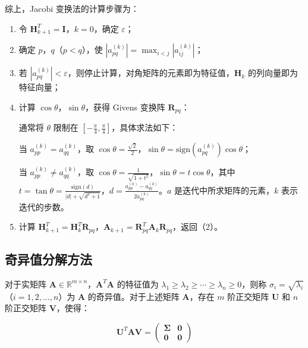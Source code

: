 综上，Jacobi 变换法的计算步骤为：

\begin{enumerate}
    \item 令 \(\mathbf{H}_{k+1}^T = \mathbf{I}\)，\(k = 0\)，确定 \(\varepsilon\)；
    \item 确定 \(p\)，\(q\)（\(p < q\)），使 \(|a_{pq}^{(k)}| = \max_{i < j} |a_{ij}^{(k)}|\)；
    \item 若 \(|a_{pq}^{(k)}| < \varepsilon\)，则停止计算，对角矩阵的元素即为特征值，\(\mathbf{H}_k\) 的列向量即为特征向量；
    \item 计算 \(\cos\theta\)，\(\sin\theta\)，获得 Givens 变换阵 \(\mathbf{R}_{pq}\)：
    
    通常将 \(\theta\) 限制在 \(\left[ -\frac{\pi}{4}, \frac{\pi}{4} \right]\)，具体求法如下：
    
    当 \(a_{pp}^{(k)} = a_{qq}^{(k)}\)，取 \(\cos\theta = \frac{\sqrt{2}}{2}\)，\(\sin\theta = \text{sign}(a_{pq}^{(k)}) \cos\theta\)；
    
    当 \(a_{pp}^{(k)} \neq a_{qq}^{(k)}\)，取 \(\cos\theta = \frac{1}{\sqrt{1 + t^2}}\)，\(\sin\theta = t \cos\theta\)，其中 \(t = \tan\theta = \frac{\text{sign}(d)}{|d| + \sqrt{d^2 + 1}}\)，\(d = \frac{a_{pp}^{(k)} - a_{qq}^{(k)}}{2 a_{pq}^{(k)}}\)。\(a\) 是迭代中所求矩阵的元素，\(k\) 表示迭代的步数。
    \item 计算 \(\mathbf{H}_{k+1}^T = \mathbf{H}_k^T \mathbf{R}_{pq}\)，\(\mathbf{A}_{k+1} = \mathbf{R}_{pq}^T \mathbf{A}_k \mathbf{R}_{pq}\)，返回（2）。
\end{enumerate}

\subsection{奇异值分解方法}

对于实矩阵 \(\mathbf{A} \in \mathbb{R}^{m \times n}\)，\(\mathbf{A}^T \mathbf{A}\) 的特征值为 \(\lambda_1 \geq \lambda_2 \geq \cdots \geq \lambda_n \geq 0\)，则称 \(\sigma_i = \sqrt{\lambda_i}\)（\(i = 1, 2, \ldots, n\)）为 \(\mathbf{A}\) 的奇异值。对于上述矩阵 \(\mathbf{A}\)，存在 \(m\) 阶正交矩阵 \(\mathbf{U}\) 和 \(n\) 阶正交矩阵 \(\mathbf{V}\)，使得：

\begin{equation}
\mathbf{U}^T \mathbf{A} \mathbf{V} = \begin{pmatrix} \mathbf{\Sigma} & \mathbf{0} \\ \mathbf{0} & \mathbf{0} \end{pmatrix} 
\end{equation}

